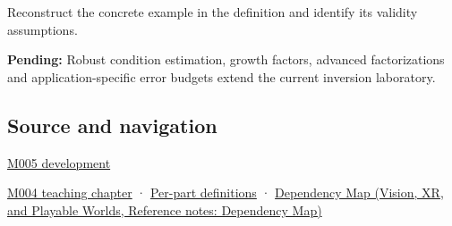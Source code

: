 Reconstruct the concrete example in the definition and identify its validity assumptions.

\textbf{Pending:} Robust condition estimation, growth factors, advanced factorizations and application-specific error budgets extend the current inversion laboratory.

\subsection{Source and navigation}\label{appendix-8f6a01f284a7-source-and-navigation}

\hyperref[01-foundations-i-ch001-when-arithmetic-meets-uncertainty]{M005 development}

\hyperref[01-foundations-i-ch001-a-stretching-ruler-for-real-valued-quantities]{M004 teaching chapter} · \hyperref[appendix-fd090d982a15-m004---parts-61-76]{Per-part definitions} · \href{../07-Vision-XR-and-Playable-Worlds/main.pdf\#nameddest=appendix-4ad47bdd269a}{Dependency Map (Vision, XR, and Playable Worlds, Reference notes: Dependency Map)}
